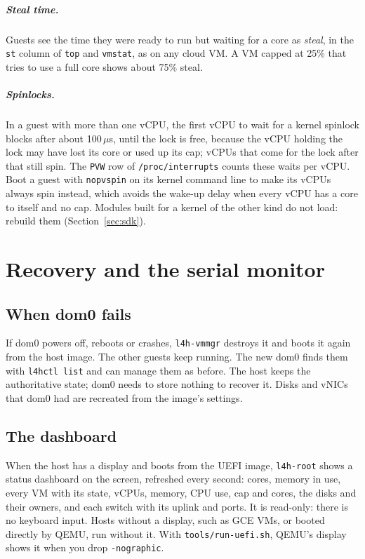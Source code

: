 \documentclass[11pt,a4paper]{report}
\newcommand{\cmd}[1]{\texttt{#1}}
\newcommand{\file}[1]{\texttt{#1}}
\begin{document}
\paragraph{Steal time.} Guests see the time they were ready to run but
waiting for a core as \emph{steal}, in the \texttt{st} column of
\cmd{top} and \cmd{vmstat}, as on any cloud VM. A VM capped at 25\% that tries
to use a full core shows about 75\% steal.

\paragraph{Spinlocks.} In a guest with more than one vCPU, the first vCPU
to wait for a kernel spinlock blocks after about 100\,$\mu$s, until the
lock is free, because the vCPU holding the lock may have lost its core or
used up its cap; vCPUs that come for the lock after that still spin. The
\texttt{PVW} row of \file{/proc/interrupts} counts these waits per vCPU.
Boot a guest with \texttt{nopvspin} on its kernel command line to make its
vCPUs always spin instead, which avoids the wake-up delay when every vCPU
has a core to itself and no cap. Modules built for a kernel of the other
kind do not load: rebuild them (Section~\ref{sec:sdk}).

\chapter{Recovery and the serial monitor}
\label{ch:recovery}

\section{When dom0 fails}

If dom0 powers off, reboots or crashes, \texttt{l4h-vmmgr} destroys it and
boots it again from the host image. The other guests keep running. The new
dom0 finds them with \cmd{l4hctl list} and can manage them as before.
The host keeps the authoritative state; dom0 needs to store
nothing to recover it. Disks and vNICs that dom0 had are recreated from the
image's settings.

\section{The dashboard}

When the host has a display and boots from the UEFI image, \texttt{l4h-root}
shows a status dashboard on the screen, refreshed every second: cores,
memory in use, every VM with its state, vCPUs, memory, CPU use, cap and
cores, the disks and their owners, and each switch with its uplink and
ports. It is read-only: there is no keyboard input. Hosts without a display,
such as GCE VMs, or booted directly by QEMU, run without it. With
\cmd{tools/run-uefi.sh}, QEMU's display shows it when you drop
\texttt{-nographic}.
\end{document}
